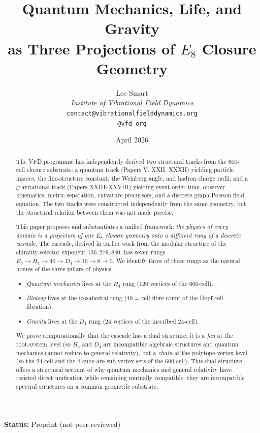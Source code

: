 \documentclass[12pt]{article}
\title{Quantum Mechanics, Life, and Gravity\\[6pt]
\large as Three Projections of $E_8$ Closure Geometry}
\author{%
  Lee Smart\\[4pt]
  \textit{Institute of Vibrational Field Dynamics}\\[2pt]
  \texttt{contact@vibrationalfielddynamics.org}\\[2pt]
  \texttt{@vfd\_org}%
}
\date{April 2026}
\begin{document}
\maketitle

\noindent\textbf{Status:} Preprint (not peer-reviewed)

\begin{abstract}
The VFD programme has independently derived two structural tracks from the 600-cell closure substrate: a quantum track (Papers V, XXII, XXXII) yielding particle masses, the fine-structure constant, the Weinberg angle, and hadron charge radii; and a gravitational track (Papers XXIII--XXVIII) yielding event-order time, observer kinematics, metric separation, curvature precursors, and a discrete graph-Poisson field equation. The two tracks were constructed independently from the same geometry, but the structural relation between them was not made precise.

This paper proposes and substantiates a unified framework: \emph{the physics of every domain is a projection of one $E_8$ closure geometry onto a different rung of a discrete cascade}. The cascade, derived in earlier work from the modular structure of the chirality-selector exponent $136{,}279{,}840$, has seven rungs $E_8 \to H_4 \to 40 \to D_4 \to 16 \to 8 \to 0$. We identify three of these rungs as the natural homes of the three pillars of physics:
\begin{itemize}
\item \emph{Quantum mechanics} lives at the $H_4$ rung (120 vertices of the 600-cell).
\item \emph{Biology} lives at the icosahedral rung (40 = cell-fibre count of the Hopf cell-fibration).
\item \emph{Gravity} lives at the $D_4$ rung (24 vertices of the inscribed 24-cell).
\end{itemize}
We prove computationally that the cascade has a dual structure: it is a \emph{fan} at the root-system level (so $H_4$ and $D_4$ are incompatible algebraic structures and quantum mechanics cannot reduce to general relativity), but a \emph{chain} at the polytope-vertex level (so the 24-cell and the 4-cube are sub-vertex sets of the 600-cell). This dual structure offers a structural account of why quantum mechanics and general relativity have resisted direct unification while remaining mutually compatible: they are incompatible spectral structures on a common geometric substrate.


\end{abstract}
\end{document}
